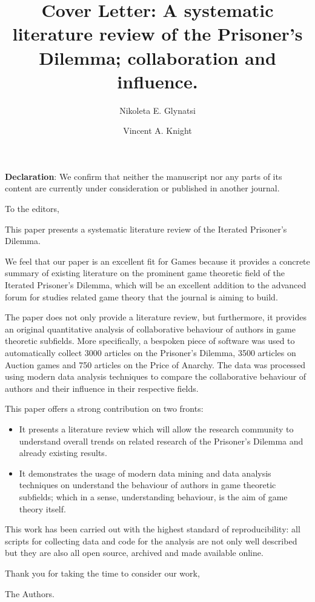 \documentclass{article}
\title{Cover Letter: A systematic literature review of the Prisoner's Dilemma; collaboration and influence.}
\author[1]{Nikoleta E. Glynatsi}
\author[1]{Vincent A. Knight}
\affil[1]{Cardiff University, School of Mathematics, Cardiff, United Kingdom}
\date{}
\begin{document}
\maketitle
\bigskip
\textbf{Declaration}: We confirm that neither the manuscript nor any parts of its
content are currently under consideration or published in another journal.

To the editors,

This paper presents a systematic literature review of the Iterated Prisoner's
Dilemma.

We feel that our paper is an excellent fit for Games because it provides a
concrete summary of existing literature on the prominent game theoretic field of
the Iterated Prisoner's Dilemma, which will be an excellent addition to the
advanced forum for studies related game theory that the journal is aiming to
build.

The paper does not only provide a literature review, but furthermore, it
provides an original quantitative analysis of collaborative behaviour of authors
in game theoretic subfields. More specifically, a bespoken piece of software
was used to automatically collect 3000 articles on the Prisoner's Dilemma, 3500
articles on Auction games and 750 articles on the Price of Anarchy. The data was
processed using modern data analysis techniques to compare the collaborative
behaviour of authors and their influence in their respective fields.

This paper offers a strong contribution on two fronts:

\begin{itemize}
    \item It presents a literature review which will allow the research
    community to understand overall trends on related research of the Prisoner's
    Dilemma and already existing results.
    \item It demonstrates the usage of modern data mining and data analysis
    techniques on understand the behaviour of authors in game theoretic
    subfields; which in a sense, understanding behaviour, is the aim of game
    theory itself.
\end{itemize}

This work has been carried out with the highest standard of reproducibility: all
scripts for collecting data and code for the analysis are not only well described but they
are also all open source, archived and made available online.


Thank you for taking the time to consider our work,

The Authors.
\end{document}

